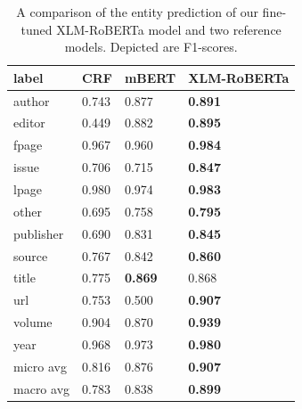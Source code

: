 \begin{table}[!ht]
\centering
\begin{tabular}{l|
>{\columncolor[HTML]{DAE8FC}}l |
>{\columncolor[HTML]{EFEFEF}}l |
>{\columncolor[HTML]{DAE8FC}}l |}
\hline
\multicolumn{1}{|l|}{\textbf{label}}    & \textbf{CRF} & \textbf{mBERT} & \textbf{XLM-RoBERTa} \\ \hline\hline
\multicolumn{1}{|l|}{author}    & 0.743        & 0.877          & \textbf{0.891}       \\ \hline
\multicolumn{1}{|l|}{editor}    & 0.449        & 0.882          & \textbf{0.895}       \\ \hline
\multicolumn{1}{|l|}{fpage}     & 0.967        & 0.960          & \textbf{0.984}       \\ \hline
\multicolumn{1}{|l|}{issue}     & 0.706        & 0.715          & \textbf{0.847}       \\ \hline
\multicolumn{1}{|l|}{lpage}     & 0.980        & 0.974          & \textbf{0.983}       \\ \hline
\multicolumn{1}{|l|}{other}     & 0.695        & 0.758          & \textbf{0.795}       \\ \hline
\multicolumn{1}{|l|}{publisher} & 0.690        & 0.831          & \textbf{0.845}       \\ \hline
\multicolumn{1}{|l|}{source}    & 0.767        & 0.842          & \textbf{0.860}       \\ \hline
\multicolumn{1}{|l|}{title}     & 0.775        & \textbf{0.869} & 0.868                \\ \hline
\multicolumn{1}{|l|}{url}       & 0.753        & 0.500          & \textbf{0.907}       \\ \hline
\multicolumn{1}{|l|}{volume}    & 0.904        & 0.870          & \textbf{0.939}       \\ \hline
\multicolumn{1}{|l|}{year}      & 0.968        & 0.973          & \textbf{0.980}       \\ \hline\hline
\multicolumn{1}{|l|}{micro avg} & 0.816        & 0.876          & \textbf{0.907}       \\ \hline
\multicolumn{1}{|l|}{macro avg} & 0.783        & 0.838          & \textbf{0.899}       \\ \hline
\end{tabular}
\caption{A comparison of the entity prediction of our fine-tuned XLM-RoBERTa model and two reference models. Depicted are F1-scores.}
\label{tab:results_refseg_compare}
\end{table}

